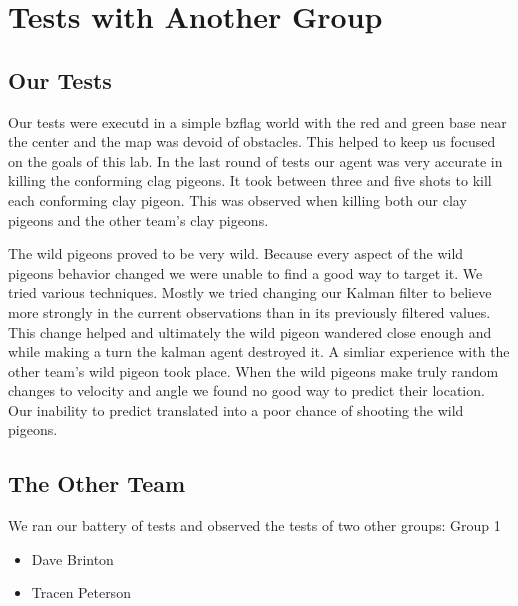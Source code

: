 \section{Tests with Another Group}
\subsection{Our Tests}
Our tests were executd in a simple bzflag world with the red and green base near the center and the map was devoid of obstacles.  This helped to keep us focused on the goals of this lab.  In the last round of tests our agent was very accurate in killing the conforming clag pigeons.  It took between three and five shots to kill each conforming clay pigeon.  This was observed when killing both our clay pigeons and the other team's clay pigeons.
\par
The wild pigeons proved to be very wild.  Because every aspect of the wild pigeons behavior changed we were unable to find a good way to target it.  We tried various techniques.  Mostly we tried changing our Kalman filter to believe more strongly in the current observations than in its previously filtered values.  This change helped and ultimately the wild pigeon wandered close enough and while making a turn the kalman agent destroyed it.  A simliar experience with the other team's wild pigeon took place.  When the wild pigeons make truly random changes to velocity and angle we found no good way to predict their location.  Our inability to predict translated into a poor chance of shooting the wild pigeons.
\subsection{The Other Team}
We ran our battery of tests and observed the tests of two other groups:
Group 1
\begin{itemize}
    \item{Dave Brinton}
    \item{Tracen Peterson}
\end{itemize}

